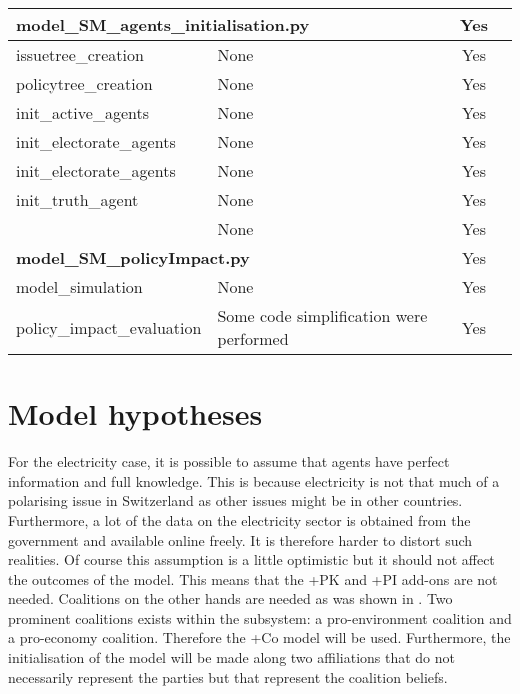 \documentclass[12pt]{article}
\begin{document}
\begin{longtable}{|l|p{6cm}|c|c|}
\multicolumn{2}{|l|}{{\bfseries model\_SM\_agents\_initialisation.py}}
									& Yes	\\ \hline
issuetree\_creation			& None		& Yes	\\ \hline
policytree\_creation			& None		& Yes	\\ \hline
init\_active\_agents			& None		& Yes	\\ \hline
init\_electorate\_agents		& None		& Yes	\\ \hline
init\_electorate\_agents		& None		& Yes	\\ \hline
init\_truth\_agent			& None		& Yes	\\ \hline
						& None		& Yes	\\ \hline
\multicolumn{2}{|l|}{{\bfseries model\_SM\_policyImpact.py}}
									& Yes	\\ \hline
model\_simulation			& None		& Yes	\\ \hline
policy\_impact\_evaluation	& Some code simplification were performed
									& Yes	\\ \hline
	
\end{longtable}


\section{Model hypotheses}
\label{sec:hypotheses}

For the electricity case, it is possible to assume that agents have perfect information and full knowledge. This is because electricity is not that much of a polarising issue in Switzerland as other issues might be in other countries. Furthermore, a lot of the data on the electricity sector is obtained from the government and available online freely. It is therefore harder to distort such realities. Of course this assumption is a little optimistic but it should not affect the outcomes of the model. This means that the +PK and +PI add-ons are not needed. Coalitions on the other hands are needed as was shown in \cite{markard2016socio}. Two prominent coalitions exists within the subsystem: a pro-environment coalition and a pro-economy coalition. Therefore the +Co model will be used. Furthermore, the initialisation of the model will be made along two affiliations that do not necessarily represent the parties but that represent the coalition beliefs.
\end{document}
